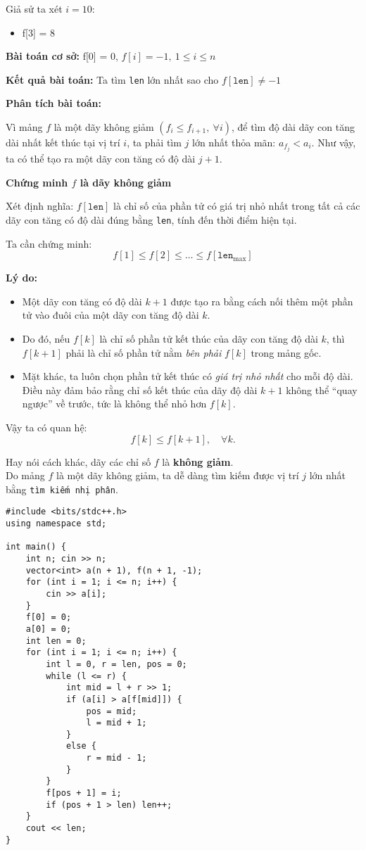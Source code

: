 Giả sử ta xét $i = 10:$
\begin{itemize}
  \item f[3] = 8
\end{itemize}

\textbf{Bài toán cơ sở:} f[0] = 0,  $f[i] = -1, \  1 \leq i \leq n$

\textbf{Kết quả bài toán:} Ta tìm \texttt{len} lớn nhất sao cho $f[\texttt{len}] \neq -1$ 

\textbf{Phân tích bài toán:}

Vì mảng $f$ là một dãy không giảm $(f_i \leq f_{i + 1}, \ \forall i)$, để tìm độ dài dãy con tăng dài nhất kết thúc tại vị trí $i$, ta phải tìm $j$ lớn nhất thỏa mãn: $a_{f_j} < a_i$. Như vậy, ta có thể tạo ra một dãy con tăng có độ dài $j + 1$. 

\textbf{Chứng minh $f$ là dãy không giảm}

Xét định nghĩa: $f[\texttt{len}]$ là chỉ số của phần tử có giá trị nhỏ nhất trong tất cả các dãy con tăng có độ dài đúng bằng \texttt{len}, tính đến thời điểm hiện tại.

Ta cần chứng minh:
\[
f[1] \leq f[2] \leq \dots \leq f[\texttt{len}_{\max}]
\]

\textbf{Lý do:}

\begin{itemize}
  \item Một dãy con tăng có độ dài $k+1$ được tạo ra bằng cách nối thêm một phần tử vào đuôi của một dãy con tăng độ dài $k$.
  \item Do đó, nếu $f[k]$ là chỉ số phần tử kết thúc của dãy con tăng độ dài $k$, thì $f[k+1]$ phải là chỉ số phần tử nằm \emph{bên phải} $f[k]$ trong mảng gốc.
  \item Mặt khác, ta luôn chọn phần tử kết thúc có \emph{giá trị nhỏ nhất} cho mỗi độ dài. Điều này đảm bảo rằng chỉ số kết thúc của dãy độ dài $k+1$ không thể “quay ngược” về trước, tức là không thể nhỏ hơn $f[k]$.
\end{itemize}

Vậy ta có quan hệ:
\[
f[k] \leq f[k+1], \quad \forall k.
\]

Hay nói cách khác, dãy các chỉ số $f$ là \textbf{không giảm}.\\

Do mảng $f$ là một dãy không giảm, ta dễ dàng tìm kiếm được vị trí $j$ lớn nhất bằng \texttt{tìm kiếm nhị phân}.

\begin{lstlisting}[title=\centering \textbf{Cài đặt}]
#include <bits/stdc++.h>
using namespace std;

int main() {
    int n; cin >> n;
    vector<int> a(n + 1), f(n + 1, -1);
    for (int i = 1; i <= n; i++) {
        cin >> a[i];
    }
    f[0] = 0;
    a[0] = 0;
    int len = 0;
    for (int i = 1; i <= n; i++) {
        int l = 0, r = len, pos = 0;
        while (l <= r) {
            int mid = l + r >> 1;
            if (a[i] > a[f[mid]]) {
                pos = mid;
                l = mid + 1;
            }
            else {
                r = mid - 1;
            }
        }
        f[pos + 1] = i;
        if (pos + 1 > len) len++;
    }
    cout << len;
}
\end{lstlisting}

